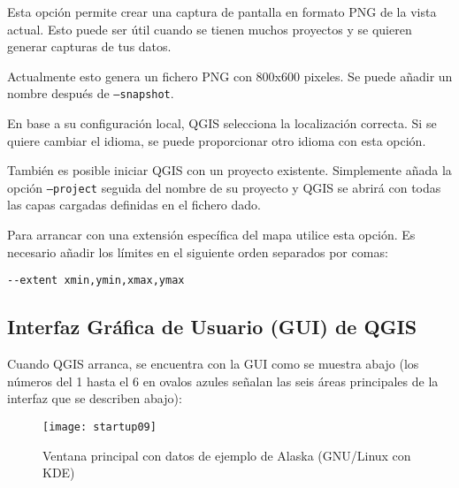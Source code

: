 \begin{Tip} \caption{\textsc{Ejemplo utilizando argumentos en línea de órdenes}}
\end{Tip}

Esta opción permite crear una captura de pantalla en formato PNG de la vista actual.
Esto puede ser útil cuando se tienen muchos proyectos y se quieren generar capturas de tus datos.

Actualmente esto genera un fichero PNG con 800x600 pixeles. Se puede añadir un nombre después de
\texttt{---snapshot}.

En base a su configuración local, QGIS selecciona la localización correcta. Si se quiere cambiar el idioma,
se puede proporcionar otro idioma con esta opción.

También es posible iniciar QGIS con un proyecto existente. Simplemente añada 
la opción \texttt{--project} seguida del nombre de su proyecto y QGIS se abrirá 
con todas las capas cargadas definidas en el fichero dado.

Para arrancar con una extensión específica del mapa utilice esta opción. Es necesario
añadir los límites en el siguiente orden separados por comas:
\begin{verbatim}
--extent xmin,ymin,xmax,ymax
\end{verbatim}


\subsection{Interfaz Gráfica de Usuario (GUI) de QGIS}
\label{label_qgismainwindow}

Cuando QGIS arranca, se encuentra con la GUI como se muestra abajo
(los números del 1 hasta el 6 en ovalos azules señalan las seis áreas principales 
de la interfaz que se describen abajo):

\begin{figure}[ht]
   \begin{center}
   \caption{Ventana principal con datos de ejemplo de Alaska (GNU/Linux con KDE)}\label{fig:startup}
   \texttt{[image: startup09]}
\end{center} 
\end{figure}

